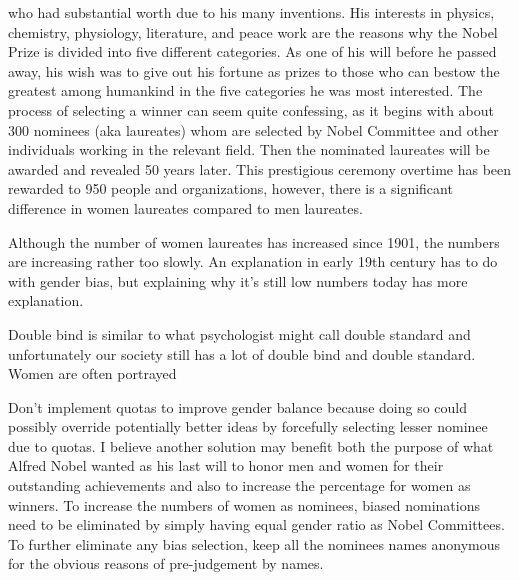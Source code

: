 who had substantial worth due to his many inventions. His interests in physics, chemistry, physiology,
literature, and peace work are the reasons why the Nobel Prize is divided into five different categories.
As one of his will before he passed away, his wish was to give out his fortune as prizes to those who can 
bestow the greatest among humankind in the five categories he was most interested. The process of selecting
a winner can seem quite confessing, as it begins with about 300 nominees (aka laureates) whom are selected
by Nobel Committee and other individuals working in the relevant field. Then the nominated laureates will
be awarded and revealed 50 years later. This prestigious ceremony overtime has been rewarded to 950 people
and organizations, however, there is a significant difference in women laureates compared to men laureates.
~\cite{alfrednoble}

\par
Although the number of women laureates has increased since 1901, the numbers are increasing rather too slowly.
An explanation in early 19th century has to do with gender bias, but explaining why it's still low numbers today
has more explanation. 

\clearpage
{}
\par
{}\cite{doublebind}
\par
Double bind is similar to what psychologist might call double standard and unfortunately our society still
has a lot of double bind and double standard. Women are often portrayed 

\clearpage
{}
\par
Don't implement quotas to improve gender balance because doing so could possibly override potentially
better ideas by forcefully selecting lesser nominee due to quotas. I believe another solution may benefit both
the purpose of what Alfred Nobel wanted as his last will to honor men and women for their outstanding achievements
and also to increase the percentage for women as winners. To increase the numbers of women as nominees, biased
nominations need to be eliminated by simply having equal gender ratio as Nobel Committees. To further eliminate
any bias selection, keep all the nominees names anonymous for the obvious reasons of pre-judgement by names.
